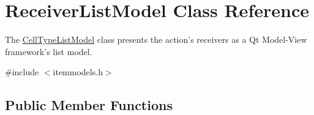 \hypertarget{class_receiver_list_model}{\section{\-Receiver\-List\-Model \-Class \-Reference}
\label{class_receiver_list_model}
}


\-The \hyperlink{class_cell_type_list_model}{\-Cell\-Type\-List\-Model} class presents the action's receivers as a \-Qt \-Model-\/\-View framework's list model.  




{\ttfamily \#include $<$itemmodels.\-h$>$}

\subsection*{\-Public \-Member \-Functions}
